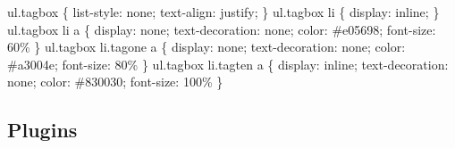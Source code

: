 \begin{enumerate}
    ul.tagbox \{ list-style: none; text-align: justify; \}\newline
    ul.tagbox li \{ display: inline; \}\newline
    ul.tagbox li a \{ display: none; text-decoration: none; color: \#e05698; font-size: 60\% \} \newline
    ul.tagbox li.tagone a \{  display: none; text-decoration: none; color: \#a3004e; font-size: 80\% \} \newline
    ul.tagbox li.tagten a \{  display: inline; text-decoration: none; color: \#830030; font-size: 100\% \} \newline
\end{enumerate}

\subsection{Plugins} 
